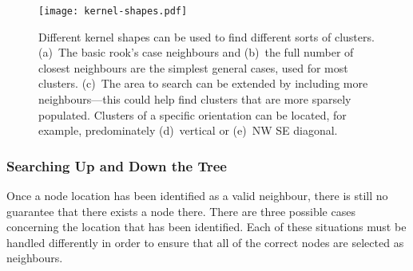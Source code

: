 \begin{figure}[tbh]
	\centering
	\texttt{[image: kernel-shapes.pdf]}

	\caption[Different kernel shapes for different clusters.]{Different kernel
		shapes can be used to find different sorts of clusters. (a)~The basic
		rook's case neighbours and (b)~the full number of closest neighbours
		are the simplest general cases, used for most clusters. (c)~The area to
		search can be extended by including more neighbours---this could help
		find clusters that are more sparsely populated. Clusters of a specific
		orientation can be located, for example, predominately (d)~vertical or
		(e)~NW SE diagonal.}\label{fig:kernel-shapes}
\end{figure}

\subsubsection{Searching Up and Down the Tree}
\label{ssub:searching_up_and_down_the_tree}

Once a node location has been identified as a valid neighbour, there is still
no guarantee that there exists a node there. There are three possible cases
concerning the location that has been identified. Each of these situations must
be handled differently in order to ensure that all of the correct nodes are
selected as neighbours.

